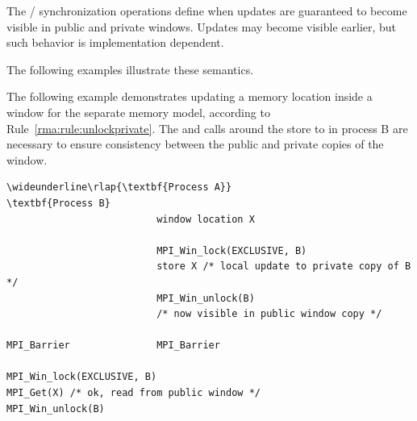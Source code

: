 \begin{users}
The \RMA/ synchronization operations define when updates are guaranteed
to become visible in public and private windows. Updates may become
visible earlier, but such behavior is implementation dependent.
\end{users}

The following examples illustrate these semantics.

\begin{example}
\label{ex:mpi_rma_rule5}
%
The following example demonstrates updating a memory location inside a
window for the separate memory model, according to
Rule~\ref{rma:rule:unlockprivate}.  The  and
 calls around the store to  in
process B are necessary 
to ensure consistency between the public and private copies of the
window.
\begin{Verbatim}[commandchars=\\\{\}]
\wideunderline\rlap{\textbf{Process A}}                          \textbf{Process B}
                          window location X

                          MPI_Win_lock(EXCLUSIVE, B)
                          store X /* local update to private copy of B */
                          MPI_Win_unlock(B)
                          /* now visible in public window copy */

MPI_Barrier               MPI_Barrier

MPI_Win_lock(EXCLUSIVE, B)
MPI_Get(X) /* ok, read from public window */
MPI_Win_unlock(B)
\end{Verbatim}
\lstset{fancyvrb=false}
\end{example}

